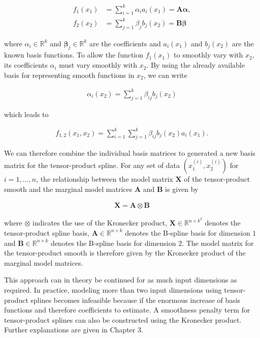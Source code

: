 \documentclass[10pt,a4paper]{article}
\begin{document}
\begin{align}
	f_1(x_1) &= \sum_{i=1}^{k} \alpha_i a_i(x_1) = \boldsymbol{A} \boldsymbol{\alpha}, \\
	f_2(x_2) &= \sum_{j=1}^{k} \beta_j b_j(x_2) = \boldsymbol{B} \boldsymbol{\beta}
\end{align}

where $\alpha_i \in \mathbb{R}^{k}$ and $\boldsymbol{\beta}_j \in \mathbb{R}^{k}$ are the coefficients and $a_i(x_1)$ and $b_j(x_2)$ are the known basis functions. To allow the function $f_1(x_1)$ to smoothly vary with $x_2$, its coefficients $\alpha_i$ must vary smoothly with $x_2$. By using the already available basis for representing smooth functions in $x_2$, we can write

\begin{align}
	\alpha_i(x_2) = \sum_{j=1}^{k} \beta_{ij} b_j(x_2)
\end{align}

which leads to

\begin{align}
	f_{1,2}(x_1, x_2) = \sum_{i=1}^{k} \sum_{j=1}^{k} \beta_{ij} b_j(x_2) a_i(x_1).
\end{align}

We can therefore combine the individual basis matrices to generated a new basis matrix for the tensor-product spline. For any set of data $(x^{(i)}_{1}, x^{(i)}_{2})$ for $i = 1, \dots, n$, the relationship between the model matrix $\boldsymbol{X}$ of the tensor-product smooth and the marginal model matrices $\boldsymbol{A}$ and $\boldsymbol{B}$ is given by 

\begin{align}
	\boldsymbol{X} = \boldsymbol{A} \otimes \boldsymbol{B}
\end{align}

where $\otimes$ indicates the use of the Kronecker product, $\boldsymbol{X} \in \mathbb{R}^{n \times k^2}$ denotes the tensor-product spline basis, $\boldsymbol{A} \in \mathbb{R}^{n \times k}$ denotes the B-spline basis for dimension $1$ and $\boldsymbol{B} \in \mathbb{R}^{n \times k}$ denotes the B-spline basis for dimension $2$. The model matrix for the tensor-product smooth is therefore given by the Kronecker product of the marginal model matrices. \cite{wood2006GAM}  

This approach can in theory be continued for as much input dimensions as required. In practice, modeling more than two input dimensions using tensor-product splines becomes infeasible because if the enormous increase of basis functions and therefore coefficients to estimate. A smoothness penalty term for tensor-product splines can also be constructed using the Kronecker product. Further explanations are given in Chapter 3.
\end{document}

